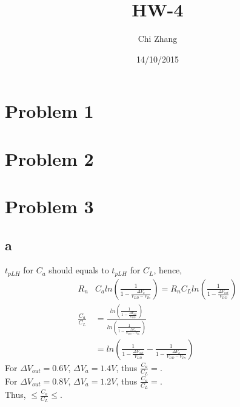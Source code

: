 \documentclass[a4paper,10pt]{article}
\title{HW-4}
\author{Chi Zhang}
\date{14/10/2015}
\begin{document}
\maketitle
\section*{Problem 1}
\section*{Problem 2}
\section*{Problem 3}
\subsection*{a}
\begin{math}t_{pLH}\end{math} for \begin{math}C_a\end{math} should equals to \begin{math}t_{pLH}\end{math} for
\begin{math}C_L\end{math}, hence,
\begin{equation}
\begin{split}
 R_n & C_a ln(\frac{1}{1-\frac{\Delta V_a}{V_{DD} - V_{Tn}}}) = R_n C_L ln(\frac{1}{1-\frac{\Delta V_{out}}{V_{DD}}})\\
 \frac{C_a}{C_L} &= \frac{ln(\frac{1}{1-\frac{\Delta V_{out}}{V_{DD}}})}{ln(\frac{1}{1-\frac{\Delta V_a}{V_{DD} - V_{Tn}}})}\\
 &= ln(\frac{1}{1-\frac{\Delta V_{out}}{V_{DD}}} - \frac{1}{1-\frac{\Delta V_a}{V_{DD} - V_{Tn}}})
\end{split}
\end{equation}
For \begin{math}\Delta V_{out} = 0.6V\end{math}, \begin{math}\Delta V_a = 1.4V\end{math}, thus 
\begin{math}\frac{C_a}{C_L} = \end{math}.\\
For \begin{math}\Delta V_{out} = 0.8V\end{math}, \begin{math}\Delta V_a = 1.2V\end{math}, thus 
\begin{math}\frac{C_a}{C_L} = \end{math}.\\
Thus, \begin{math} \leq \frac{C_a}{C_L} \leq \end{math}.
\end{document}
